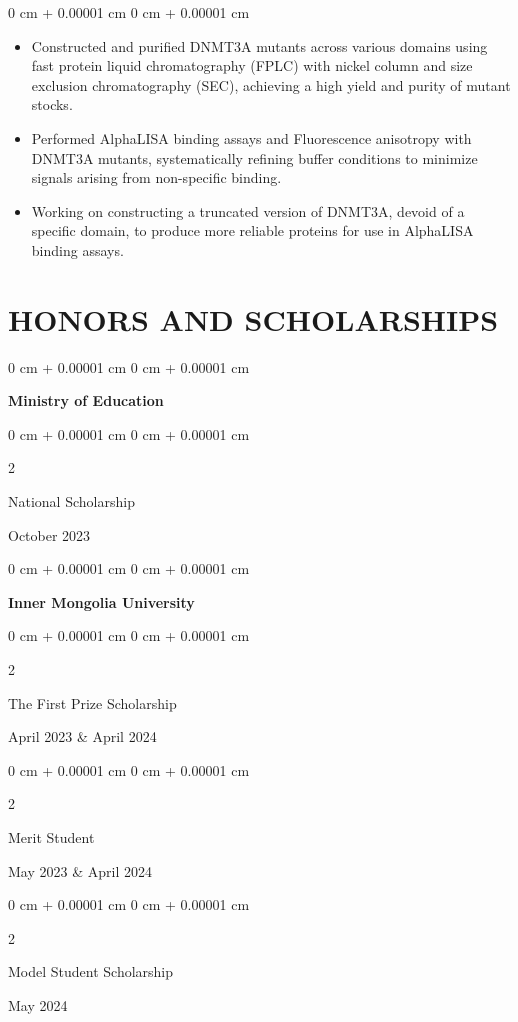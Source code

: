 \documentclass[10pt, letterpaper]{article}
\newenvironment{highlights}{
    \begin{itemize}[
        topsep=0.10 cm,
        parsep=0.10 cm,
        partopsep=0pt,
        itemsep=0pt,
        leftmargin=0 cm + 10pt
    ]
}{
    \end{itemize}
} %
\newenvironment{onecolentry}{
    \begin{adjustwidth}{
        0 cm + 0.00001 cm
    }{
        0 cm + 0.00001 cm
    }
}{
    \end{adjustwidth}
} %
\newenvironment{twocolentry}[2][]{
    \onecolentry
    \def\secondColumn{#2}
    \setcolumnwidth{\fill, 4.5 cm}
    \begin{paracol}{2}
}{
    \switchcolumn \raggedleft \secondColumn
    \end{paracol}
    \endonecolentry
} %
\begin{document}
        \vspace{0.10 cm}
        \begin{onecolentry}
            \begin{highlights}
                \item Constructed and purified DNMT3A mutants across various domains using fast protein liquid chromatography (FPLC) with nickel column and size exclusion chromatography (SEC), achieving a high yield and purity of mutant stocks.
                \item Performed AlphaLISA binding assays and Fluorescence anisotropy with DNMT3A mutants, systematically refining buffer conditions to minimize signals arising from non-specific binding.
                \item Working on constructing a truncated version of DNMT3A, devoid of a specific domain, to produce more reliable proteins for use in AlphaLISA binding assays.
            \end{highlights}
        \end{onecolentry}



    
    \section{HONORS AND SCHOLARSHIPS}



        
        \begin{onecolentry}
            {\setlength{\fontsize}{11pt}{14pt}\selectfont \textbf{Ministry of Education}}  \end{onecolentry}
 \vspace{0.1 cm}
            \begin{twocolentry}{
            \normalsize October 2023
        }
        \normalsize National Scholarship
        \end{twocolentry}

        \vspace{0.2 cm}

        \begin{onecolentry}
            {\setlength{\fontsize}{11pt}{14pt}\selectfont \textbf{Inner Mongolia University}}  \end{onecolentry}
 \vspace{0.1 cm}
            \begin{twocolentry}{
            \normalsize April 2023 \& April 2024
        }
        \normalsize The First Prize Scholarship
        \end{twocolentry}
 \vspace{0.1 cm}
            \begin{twocolentry}{
            \normalsize May 2023 \& April 2024
        }
        \normalsize Merit Student
        \end{twocolentry}
 \vspace{0.1 cm}
            \begin{twocolentry}{
            \normalsize May 2024
        }
        \normalsize Model Student Scholarship
        \end{twocolentry}
 
\end{document}
